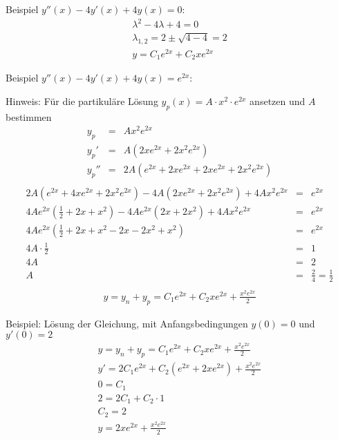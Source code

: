 Beispiel $y''(x)-4y'(x)+4y(x)=0$:
\begin{eqnarray*}
  \lambda^2-4\lambda+4=0\\
  \lambda_{1,2}=2\pm\sqrt{4-4}=2\\
  y=C_1 e^{2x} + C_2 xe^{2x}
\end{eqnarray*}

Beispiel $y''(x)-4y'(x)+4y(x)=e^{2x}$:

Hinweis: Für die partikuläre Lösung $y_p(x)=A\cdot x^2\cdot e^{2x}$ ansetzen und $A$ bestimmen
\begin{eqnarray*}
  y_p &=& Ax^2e^{2x}\\
  y_p' &=& A (2xe^{2x}+2x^2e^{2x})\\
  y_p'' &=& 2A(e^{2x}+2xe^{2x}+2xe^{2x}+2x^2e^{2x})\\
\end{eqnarray*}
\begin{eqnarray*}
  2A(e^{2x}+4xe^{2x}+2x^2e^{2x})-4A(2xe^{2x}+2x^2e^{2x})+4Ax^2e^{2x} &=& e^{2x}\\
  4Ae^{2x}(\frac{1}{2}+2x+x^2)-4Ae^{2x}(2x+2x^2)+4Ax^2e^{2x} &=& e^{2x}\\
  4Ae^{2x}(\frac{1}{2}+2x+x^2-2x-2x^2+x^2) &=& e^{2x}\\
  4A\cdot \frac{1}{2} &=& 1\\
  4A &=& 2\\
  A &=& \frac{2}{4}=\frac{1}{2}\\
\end{eqnarray*}
\begin{eqnarray*}
  y=y_n+y_p=C_1e^{2x}+C_2xe^{2x}+\frac{x^2e^{2x}}{2}
\end{eqnarray*}

Beispiel: Lösung der Gleichung, mit Anfangsbedingungen $y(0)=0$ und $y'(0)=2$
\begin{eqnarray*}
  y=y_n+y_p=C_1e^{2x}+C_2xe^{2x}+\frac{x^2e^{2x}}{2}\\
  y'=2C_1e^{2x}+C_2(e^{2x}+2xe^{2x})+\frac{x^2e^{2x}}{2}\\
  0=C_1\\
  2=2C_1+C_2 \cdot 1\\
  C_2=2\\
  y=2xe^{2x}+\frac{x^2e^{2x}}{2}
\end{eqnarray*}
